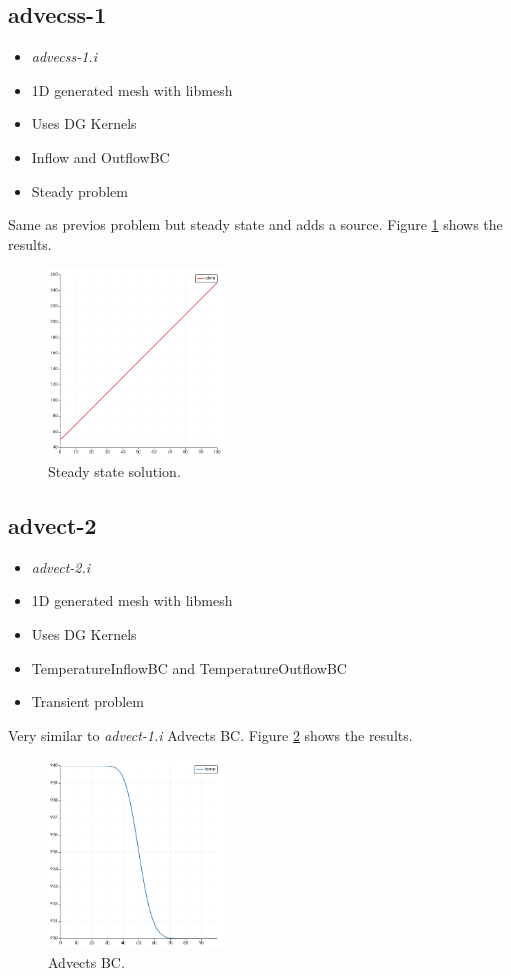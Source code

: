 \documentclass[11pt,letterpaper]{article}
\begin{document}
	\subsection{advecss-1}

	\begin{itemize}
		\item \textit{advecss-1.i}
		\item 1D generated mesh with libmesh
		\item Uses DG Kernels
		\item Inflow and OutflowBC
		\item Steady problem
	\end{itemize}

    Same as previos problem but steady state and adds a source.
    Figure \ref{fig:advecss-1} shows the results.

	\begin{figure}[htbp!]
		\centering
		\includegraphics[height=5cm]{advec1-ss}
		\caption{Steady state solution.}
		\label{fig:advecss-1}
	\end{figure}

	\subsection{advect-2}

	\begin{itemize}
		\item \textit{advect-2.i}
		\item 1D generated mesh with libmesh
		\item Uses DG Kernels
		\item TemperatureInflowBC and TemperatureOutflowBC
		\item Transient problem
	\end{itemize}

    Very similar to \textit{advect-1.i}
    Advects BC.
    Figure \ref{fig:advect-2} shows the results.

	\begin{figure}[htbp!]
		\centering
		\includegraphics[height=5cm]{advec2}
		\caption{Advects BC.}
		\label{fig:advect-2}
	\end{figure}
\end{document}

